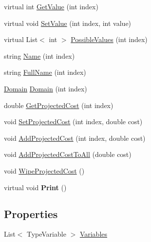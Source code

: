 \begin{DoxyCompactItemize}
\item 
virtual int \hyperlink{classghost_1_1SetVariables_3_01TypeVariable_01_4_a4a5330430dfd94a46a718e28a0355d91}{Get\-Value} (int index)
\item 
virtual void \hyperlink{classghost_1_1SetVariables_3_01TypeVariable_01_4_a6f4f72d36727cf96522ed6e5635b5c27}{Set\-Value} (int index, int value)
\item 
virtual List$<$ int $>$ \hyperlink{classghost_1_1SetVariables_3_01TypeVariable_01_4_ad382b5c9045b7f5d5bc1baf2b8121bb4}{Possible\-Values} (int index)
\item 
string \hyperlink{classghost_1_1SetVariables_3_01TypeVariable_01_4_adea50d515383d6c0252d36a164213d83}{Name} (int index)
\item 
string \hyperlink{classghost_1_1SetVariables_3_01TypeVariable_01_4_a7f32c243dd4c5b434c2b3d51c8b37e5e}{Full\-Name} (int index)
\item 
\hyperlink{classghost_1_1Domain}{Domain} \hyperlink{classghost_1_1SetVariables_3_01TypeVariable_01_4_ab9627fb96652fc476da1a0d04ebdc815}{Domain} (int index)
\item 
double \hyperlink{classghost_1_1SetVariables_3_01TypeVariable_01_4_a1c2845e80b182788c323d5f55448a3a1}{Get\-Projected\-Cost} (int index)
\item 
void \hyperlink{classghost_1_1SetVariables_3_01TypeVariable_01_4_aabb6b1627b9646c6ff2f597fb76d616d}{Set\-Projected\-Cost} (int index, double cost)
\item 
void \hyperlink{classghost_1_1SetVariables_3_01TypeVariable_01_4_a1da3f2f04ad8bfd5f18b28a5da210ae3}{Add\-Projected\-Cost} (int index, double cost)
\item 
void \hyperlink{classghost_1_1SetVariables_3_01TypeVariable_01_4_a6c3a9c333c17c16651a112a74740fae7}{Add\-Projected\-Cost\-To\-All} (double cost)
\item 
void \hyperlink{classghost_1_1SetVariables_3_01TypeVariable_01_4_ac546924f8bab416aa499a427c81cf6c1}{Wipe\-Projected\-Cost} ()
\item 
\hypertarget{classghost_1_1SetVariables_3_01TypeVariable_01_4_ac254fd0d11c3effcaff7689d9954062b}{virtual void {\bfseries Print} ()}\label{classghost_1_1SetVariables_3_01TypeVariable_01_4_ac254fd0d11c3effcaff7689d9954062b}

\end{DoxyCompactItemize}
\subsection*{Properties}
\begin{DoxyCompactItemize}
\item 
List$<$ Type\-Variable $>$ \hyperlink{classghost_1_1SetVariables_3_01TypeVariable_01_4_a1aa6a24ebcf2782dbd09e186e5c000d8}{Variables}
\end{DoxyCompactItemize}


